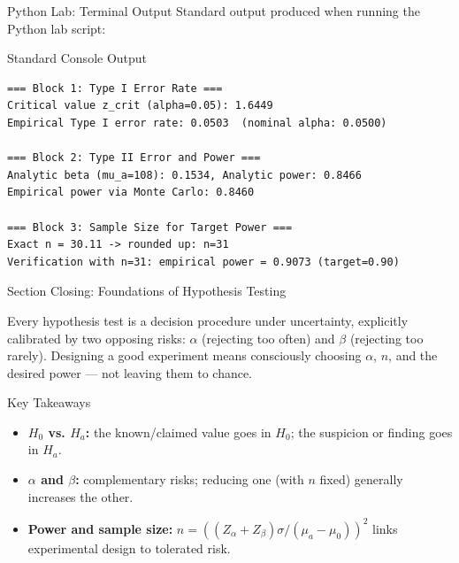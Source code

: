 \documentclass[10pt, aspectratio=169]{beamer}
\begin{document}
\begin{frame}[fragile]{Python Lab: Terminal Output}
  \scriptsize
  Standard output produced when running the Python lab script:
  \vspace{0.02cm}
  \begin{block}{Standard Console Output}
    \fontsize{4pt}{5pt}\selectfont
    \begin{verbatim}
=== Block 1: Type I Error Rate ===
Critical value z_crit (alpha=0.05): 1.6449
Empirical Type I error rate: 0.0503  (nominal alpha: 0.0500)

=== Block 2: Type II Error and Power ===
Analytic beta (mu_a=108): 0.1534, Analytic power: 0.8466
Empirical power via Monte Carlo: 0.8460

=== Block 3: Sample Size for Target Power ===
Exact n = 30.11 -> rounded up: n=31
Verification with n=31: empirical power = 0.9073 (target=0.90)
    \end{verbatim}
  \end{block}
\end{frame}


\begin{frame}{Section Closing: Foundations of Hypothesis Testing}
  \begin{reflexion}
    Every hypothesis test is a decision procedure under uncertainty, explicitly calibrated by two opposing risks: $\alpha$ (rejecting too often) and $\beta$ (rejecting too rarely). Designing a good experiment means consciously choosing $\alpha$, $n$, and the desired power --- not leaving them to chance.
  \end{reflexion}

  \vspace{0.2cm}
  \pause
  \begin{block}{Key Takeaways}
    \begin{itemize}\itemsep=0.08cm
      \item \textbf{$H_0$ vs. $H_a$:} the known/claimed value goes in $H_0$; the suspicion or finding goes in $H_a$.
      \item \textbf{$\alpha$ and $\beta$:} complementary risks; reducing one (with $n$ fixed) generally increases the other.
      \item \textbf{Power and sample size:} $n=((Z_\alpha+Z_\beta)\sigma/(\mu_a-\mu_0))^2$ links experimental design to tolerated risk.
    \end{itemize}
  \end{block}
\end{frame}
\end{document}
